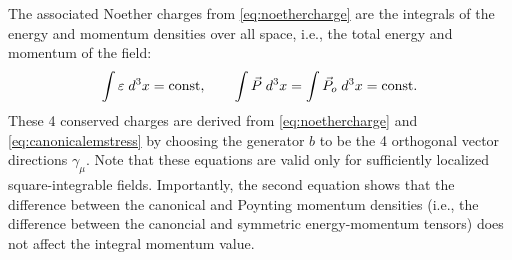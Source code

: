 \documentclass[1p,sort&compress]{elsarticle}
\numberwithin{equation}{section}
\begin{document}
The associated Noether charges from \eqref{eq:noethercharge} are the integrals of the energy and momentum densities over all space, i.e., the total energy and momentum of the field:
\begin{align}\label{eq:integralEM}
\int \varepsilon \; d^3x = {\rm const},~~~~~~ \int \vec{P} \; d^3x = \int \vec{P}_o \; d^3x = {\rm const}.
\end{align}
These 4 conserved charges are derived from \eqref{eq:noethercharge} and \eqref{eq:canonicalemstress} by choosing the generator $b$ to be the 4 orthogonal vector directions $\gamma_\mu$.  Note that these equations are valid only for sufficiently localized square-integrable fields. Importantly, the second equation shows that the difference between the canonical and Poynting momentum densities (i.e., the difference between the canoncial and symmetric energy-momentum tensors) does not affect the integral momentum value.
\end{document}
